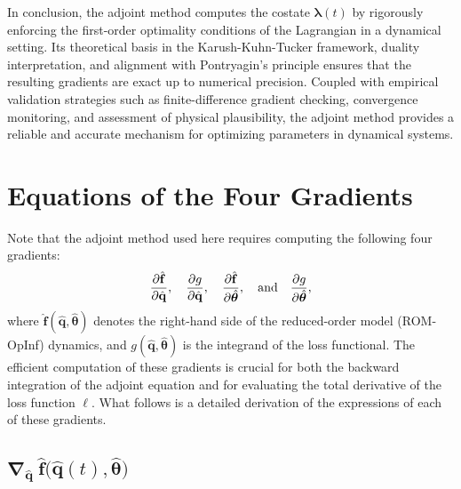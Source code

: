 In conclusion, the adjoint method computes the costate $\bm{\lambda}(t)$ by rigorously enforcing the first-order optimality conditions of the Lagrangian in a dynamical setting. Its theoretical basis in the Karush-Kuhn-Tucker framework, duality interpretation, and alignment with Pontryagin's principle ensures that the resulting gradients are exact up to numerical precision. Coupled with empirical validation strategies such as finite-difference gradient checking, convergence monitoring, and assessment of physical plausibility, the adjoint method provides a reliable and accurate mechanism for optimizing parameters in dynamical systems.


\section{Equations of the Four Gradients}

Note that the adjoint method used here requires computing the following four gradients:\\
$$\pdv{\hat{\mathbf{f}}}{\hat{\mathbf{q}}},  \quad \pdv{g}{\hat{\mathbf{q}}}, \quad \pdv{\hat{\mathbf{f}}}{\hat{\bm{\theta}}},\quad \text{and} \quad \pdv{g}{\hat{\bm{\theta}}},$$
where $\hat{\mathbf{f}}(\hat{\mathbf{q}}, \hat{\bm{\theta}})$ denotes the right-hand side of the reduced-order model (ROM-OpInf) dynamics, and $g(\hat{\mathbf{q}}, \hat{\bm{\theta}})$ is the integrand of the loss functional. The efficient computation of these gradients is crucial for both the backward integration of the adjoint equation and for evaluating the total derivative of the loss function $\ell$. What follows is a detailed derivation of the expressions of each of these gradients.

\subsection{$\bm{\nabla}_{\hat{\mathbf{q}}}~\hat{\mathbf{f}}\bigl(\hat{\mathbf{q}}(t), \hat{\bm{\theta}}\bigr)$}

